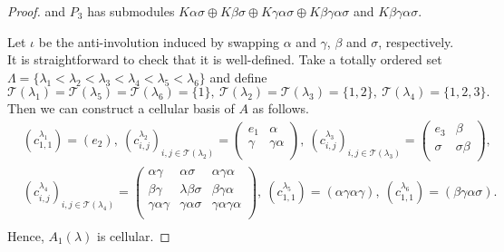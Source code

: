 \documentclass[12pt]{amsart}
\numberwithin{equation}{thm}
\newcommand\cT{\mathcal{T}}
\newcommand\la{\lambda}
\begin{document}
{\begin{proof}
\medskip
\noindent
and $P_3$ has submodules 
$K\alpha\sigma\oplus K\beta\sigma\oplus K\gamma\alpha\sigma\oplus K\beta\gamma\alpha\sigma$ 
and $K\beta\gamma\alpha\sigma$.

Let $\iota$ be the anti-involution induced by swapping $\alpha$ and $\gamma$,
$\beta$ and $\sigma$, respectively. It is straightforward to check that it is well-defined.
Take a totally ordered set $\Lambda=\{\lambda_1<\lambda_2<\lambda_3<\lambda_4<\lambda_5<\lambda_6\}$ 
and define
\[\cT(\lambda_1)=\cT(\lambda_5)=\cT(\lambda_6)=\{1\},\ \cT(\lambda_2)=\cT(\lambda_3)=\{1,2\},\ \cT(\lambda_4)=\{1,2,3\}.\]
Then we can construct a cellular basis of $A$ as follows.
\begin{align*}
& (c_{1,1}^{\lambda_1})=(e_2),\  
(c_{i,j}^{\lambda_2})_{i,j\in \cT(\la_2)}
    =\begin{pmatrix}
    e_1 & \alpha \\
    \gamma & \gamma\alpha \\
    \end{pmatrix},\ 
(c_{i,j}^{\lambda_3})_{i,j\in \cT(\la_3)}
    =\begin{pmatrix}
    e_3 & \beta \\
    \sigma & \sigma\beta \\
    \end{pmatrix},\\[7pt]
& (c_{i,j}^{\lambda_4})_{i,j\in \cT(\la_4)}
    =\begin{pmatrix}
    \alpha\gamma & \alpha\sigma & \alpha\gamma\alpha \\
    \beta\gamma & \lambda\beta\sigma & \beta\gamma\alpha \\
    \gamma\alpha\gamma & \gamma\alpha\sigma & \gamma\alpha\gamma\alpha \\
    \end{pmatrix},\ 
 (c_{1,1}^{\lambda_5})=(\alpha\gamma\alpha\gamma),\ 
 (c_{1,1}^{\lambda_6})=(\beta\gamma\alpha\sigma).\\
 \end{align*}
Hence, $A_1(\la)$ is cellular.
\end{proof}


}
\end{document}
